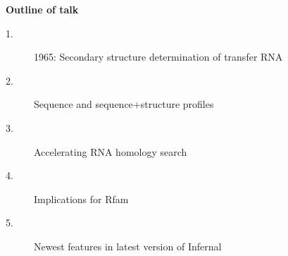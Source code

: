\documentclass[landscape]{slides}
\begin{document}

\begin{slide}
\begin{center}
\textbf{Outline of talk}

\begin{description}
\item[1.] 1965: Secondary structure determination of transfer RNA
\item[\textcolor{myorange}{2.}] \textcolor{myorange}{Sequence and sequence+structure profiles}
\item[3.] Accelerating RNA homology search
\item[4.] Implications for Rfam
\item[5.] Newest features in latest version of Infernal
\end{description}

\end{center}
\vfill
\end{slide}
\end{document}
